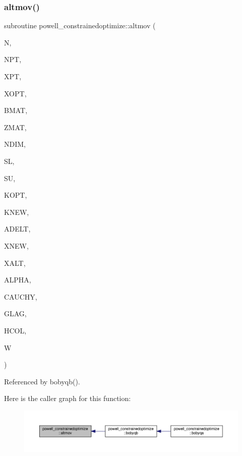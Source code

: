 \subsubsection{\texorpdfstring{altmov()}{altmov()}}
{\footnotesize\ttfamily subroutine powell\+\_\+constrainedoptimize\+::altmov (\begin{DoxyParamCaption}\item[{}]{N,  }\item[{}]{N\+PT,  }\item[{dimension(npt,$\ast$)}]{X\+PT,  }\item[{dimension($\ast$)}]{X\+O\+PT,  }\item[{dimension(ndim,$\ast$)}]{B\+M\+AT,  }\item[{dimension(npt,$\ast$)}]{Z\+M\+AT,  }\item[{}]{N\+D\+IM,  }\item[{dimension($\ast$)}]{SL,  }\item[{dimension($\ast$)}]{SU,  }\item[{}]{K\+O\+PT,  }\item[{}]{K\+N\+EW,  }\item[{}]{A\+D\+E\+LT,  }\item[{dimension($\ast$)}]{X\+N\+EW,  }\item[{dimension($\ast$)}]{X\+A\+LT,  }\item[{}]{A\+L\+P\+HA,  }\item[{}]{C\+A\+U\+C\+HY,  }\item[{dimension($\ast$)}]{G\+L\+AG,  }\item[{dimension($\ast$)}]{H\+C\+OL,  }\item[{dimension($\ast$)}]{W }\end{DoxyParamCaption})\hspace{0.3cm}{\ttfamily [private]}}



Referenced by bobyqb().

Here is the caller graph for this function\+:
\nopagebreak
\begin{figure}[H]
\begin{center}
\leavevmode
\includegraphics[width=350pt]{namespacepowell__constrainedoptimize_ad592264ce63370c7014ab5883330e26d_icgraph}
\end{center}
\end{figure}
\mbox{\label{namespacepowell__constrainedoptimize_a18b806fe9f14b759021a23344e46743a}} 
